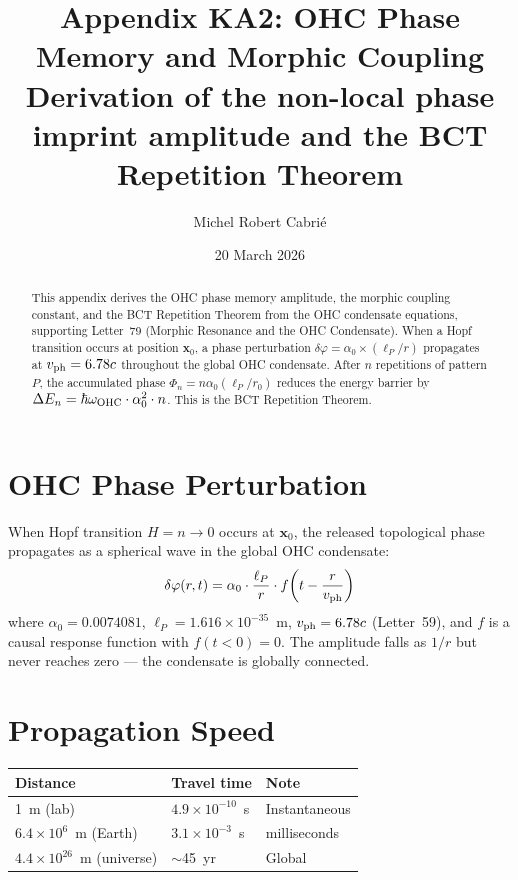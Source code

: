 \documentclass[aps,prl,twocolumn,showpacs,superscriptaddress]{revtex4-2}
\begin{document}
\title{Appendix KA2: OHC Phase Memory and Morphic Coupling\\
Derivation of the non-local phase imprint amplitude and the
BCT Repetition Theorem}

\author{Michel Robert Cabri\'e}
\date{20 March 2026}

\begin{abstract}
This appendix derives the OHC phase memory amplitude, the morphic 
coupling constant, and the BCT Repetition Theorem from the OHC 
condensate equations, supporting Letter~79 (Morphic Resonance and 
the OHC Condensate). When a Hopf transition occurs at position 
$\mathbf{x}_0$, a phase perturbation $\delta\varphi = \alpha_0 
\times (\ell_P/r)$ propagates at $v_{\rm ph} = 6.78c$ throughout 
the global OHC condensate. After $n$ repetitions of pattern $P$, 
the accumulated phase $\Phi_n = n\alpha_0(\ell_P/r_0)$ reduces the 
energy barrier by $\Delta E_n = \hbar\omega_{\rm OHC}\cdot\alpha_0^2
\cdot n$. This is the BCT Repetition Theorem.
\end{abstract}

\maketitle

\section{OHC Phase Perturbation}

When Hopf transition $H=n\to0$ occurs at $\mathbf{x}_0$, the 
released topological phase propagates as a spherical wave in the 
global OHC condensate:
\begin{equation}
    \delta\varphi(r,t) = \alpha_0 \cdot \frac{\ell_P}{r} 
    \cdot f\!\left(t - \frac{r}{v_{\rm ph}}\right)
\end{equation}
where $\alpha_0 = 0.0074081$, $\ell_P = 1.616\times10^{-35}$~m, 
$v_{\rm ph} = 6.78c$ (Letter~59), and $f$ is a causal response 
function with $f(t<0)=0$. The amplitude falls as $1/r$ but never 
reaches zero --- the condensate is globally connected.

\section{Propagation Speed}

\begin{center}
\begin{tabular}{lll}
\toprule
Distance & Travel time & Note \\
\midrule
1~m (lab) & $4.9\times10^{-10}$~s & Instantaneous \\
$6.4\times10^6$~m (Earth) & $3.1\times10^{-3}$~s & milliseconds \\
$4.4\times10^{26}$~m (universe) & $\sim$45~yr & Global \\
\bottomrule
\end{tabular}
\end{center}
\end{document}

